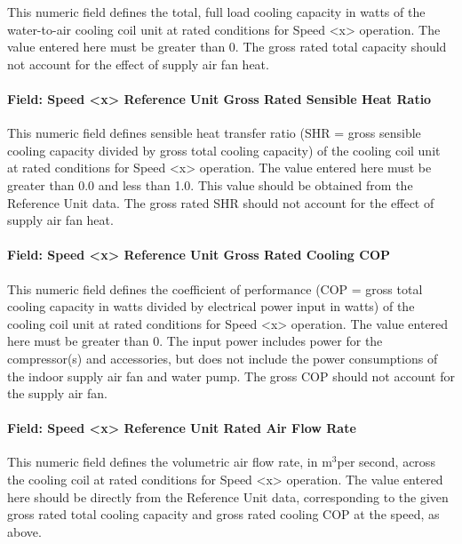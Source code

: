This numeric field defines the total, full load cooling capacity in watts of the water-to-air cooling coil unit at rated conditions for Speed \textless{}x\textgreater{} operation. The value entered here must be greater than 0. The gross rated total capacity should not account for the effect of supply air fan heat.

\paragraph{Field: Speed \textless{}x\textgreater{} Reference Unit Gross Rated Sensible Heat Ratio}\label{field-speed-x-reference-unit-gross-rated-sensible-heat-ratio-1}

This numeric field defines sensible heat transfer ratio (SHR = gross sensible cooling capacity divided by gross total cooling capacity) of the cooling coil unit at rated conditions for Speed \textless{}x\textgreater{} operation. The value entered here must be greater than 0.0 and less than 1.0. This value should be obtained from the Reference Unit data. The gross rated SHR should not account for the effect of supply air fan heat.

\paragraph{Field: Speed \textless{}x\textgreater{} Reference Unit Gross Rated Cooling COP}\label{field-speed-x-reference-unit-gross-rated-cooling-cop-1}

This numeric field defines the coefficient of performance (COP = gross total cooling capacity in watts divided by electrical power input in watts) of the cooling coil unit at rated conditions for Speed \textless{}x\textgreater{} operation. The value entered here must be greater than 0. The input power includes power for the compressor(s) and accessories, but does not include the power consumptions of the indoor supply air fan and water pump. The gross COP should not account for the supply air fan.

\paragraph{Field: Speed \textless{}x\textgreater{} Reference Unit Rated Air Flow Rate}\label{field-speed-x-reference-unit-rated-air-flow-rate-2}

This numeric field defines the volumetric air flow rate, in m\(^{3}\)per second, across the cooling coil at rated conditions for Speed \textless{}x\textgreater{} operation. The value entered here should be directly from the Reference Unit data, corresponding to the given gross rated total cooling capacity and gross rated cooling COP at the speed, as above.

